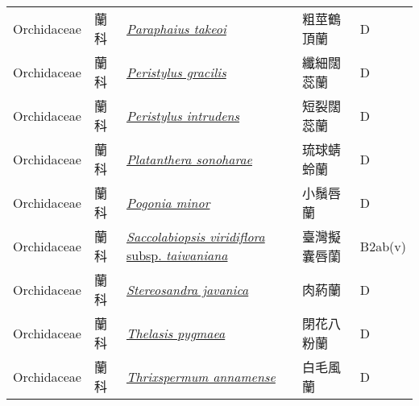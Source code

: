 {\begin{longtable}{L{2.5cm}L{2cm}L{5cm}L{2.5cm}L{3cm}}
    Orchidaceae & 蘭科 & \href{http://www.theplantlist.org/tpl1.1/search?q=Paraphaius+takeoi}{\textit{Paraphaius takeoi} } & 粗莖鶴頂蘭 & D    \\
    Orchidaceae & 蘭科 & \href{http://www.theplantlist.org/tpl1.1/search?q=Peristylus+gracilis}{\textit{Peristylus gracilis} } & 纖細闊蕊蘭 & D    \\
    Orchidaceae & 蘭科 & \href{http://www.theplantlist.org/tpl1.1/search?q=Peristylus+intrudens}{\textit{Peristylus intrudens} } & 短裂闊蕊蘭 & D    \\
    Orchidaceae & 蘭科 & \href{http://www.theplantlist.org/tpl1.1/search?q=Platanthera+sonoharae}{\textit{Platanthera sonoharae} } & 琉球蜻蛉蘭 & D    \\
    Orchidaceae & 蘭科 & \href{http://www.theplantlist.org/tpl1.1/search?q=Pogonia+minor}{\textit{Pogonia minor} } & 小鬚唇蘭 & D    \\
    Orchidaceae & 蘭科 & \href{http://www.theplantlist.org/tpl1.1/search?q=Saccolabiopsis+viridiflora+subsp.+taiwaniana}{\textit{Saccolabiopsis viridiflora} subsp. \textit{taiwaniana} } & 臺灣擬囊唇蘭 & B2ab(v)    \\
    Orchidaceae & 蘭科 & \href{http://www.theplantlist.org/tpl1.1/search?q=Stereosandra+javanica}{\textit{Stereosandra javanica} } & 肉葯蘭 & D    \\
    Orchidaceae & 蘭科 & \href{http://www.theplantlist.org/tpl1.1/search?q=Thelasis+pygmaea}{\textit{Thelasis pygmaea} } & 閉花八粉蘭 & D    \\
    Orchidaceae & 蘭科 & \href{http://www.theplantlist.org/tpl1.1/search?q=Thrixspermum+annamense}{\textit{Thrixspermum annamense} } & 白毛風蘭 & D    \\

\end{longtable}}
